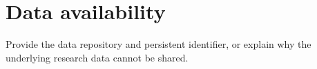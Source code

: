 \section*{Data availability}
Provide the data repository and persistent identifier, or explain why
the underlying research data cannot be shared.
